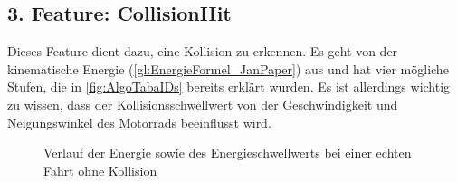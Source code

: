 \subsection{3. Feature: CollisionHit} %

Dieses Feature dient dazu, eine Kollision zu erkennen. Es geht von der kinematische Energie (\autoref{gl:EnergieFormel_JanPaper}) aus und hat vier mögliche Stufen, die in \autoref{fig:AlgoTabaIDs} bereits erklärt wurden. Es ist allerdings wichtig zu wissen, dass der Kollisionsschwellwert von der Geschwindigkeit und Neigungswinkel des Motorrads beeinflusst wird. 

 

\begin{figure}
	\centering 
	\caption{Verlauf der Energie sowie des Energieschwellwerts bei einer echten Fahrt ohne Kollision}
	\label{fig:CH_ID_2546_FullView}
\end{figure}

